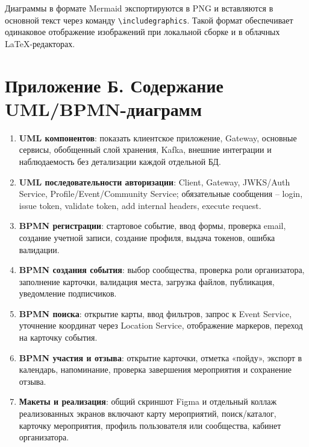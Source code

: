 Диаграммы в формате Mermaid экспортируются в PNG и вставляются в основной текст через команду \texttt{\textbackslash includegraphics}. Такой формат обеспечивает одинаковое отображение изображений при локальной сборке и в облачных LaTeX-редакторах.

\section*{Приложение Б. Содержание UML/BPMN-диаграмм}

\begin{enumerate}
    \item \textbf{UML компонентов}: показать клиентское приложение, Gateway, основные сервисы, обобщенный слой хранения, Kafka, внешние интеграции и наблюдаемость без детализации каждой отдельной БД.
    \item \textbf{UML последовательности авторизации}: Client, Gateway, JWKS/Auth Service, Profile/Event/Community Service; обязательные сообщения -- login, issue token, validate token, add internal headers, execute request.
    \item \textbf{BPMN регистрации}: стартовое событие, ввод формы, проверка email, создание учетной записи, создание профиля, выдача токенов, ошибка валидации.
    \item \textbf{BPMN создания события}: выбор сообщества, проверка роли организатора, заполнение карточки, валидация места, загрузка файлов, публикация, уведомление подписчиков.
    \item \textbf{BPMN поиска}: открытие карты, ввод фильтров, запрос к Event Service, уточнение координат через Location Service, отображение маркеров, переход на карточку события.
    \item \textbf{BPMN участия и отзыва}: открытие карточки, отметка «пойду», экспорт в календарь, напоминание, проверка завершения мероприятия и сохранение отзыва.
    \item \textbf{Макеты и реализация}: общий скриншот Figma и отдельный коллаж реализованных экранов включают карту мероприятий, поиск/каталог, карточку мероприятия, профиль пользователя или сообщества, кабинет организатора.
\end{enumerate}


